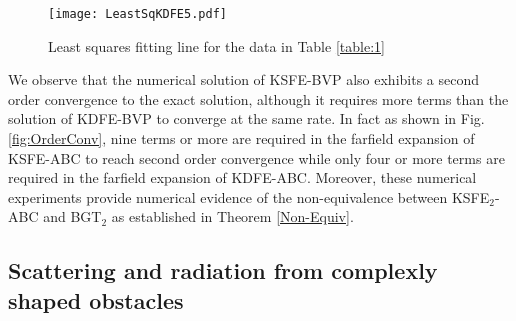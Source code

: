 \documentclass[final,3p,times,12pt]{elsarticle}
\begin{document}
\begin{figure}[h!]
\begin{center}
\texttt{[image: LeastSqKDFE5.pdf]} 
\end{center}
\caption{Least squares fitting line for the data in Table \ref{table:1}}
\label{LeastSqKDFE5}
\end{figure}
We observe that the numerical solution of KSFE-BVP also exhibits a second order convergence to the exact solution, although it requires more terms than the solution of KDFE-BVP to converge at the same rate. In fact as shown in Fig. \ref{fig:OrderConv}, nine terms or more are required in the farfield expansion of KSFE-ABC to reach second order convergence while only four or more terms are required in the farfield expansion of KDFE-ABC. Moreover, these numerical experiments provide numerical evidence of the non-equivalence between KSFE$_2$-ABC and BGT$_2$ as established in Theorem \ref{Non-Equiv}.

\subsection{Scattering and radiation from complexly shaped obstacles}
\label{ComplexObst}
\end{document}
